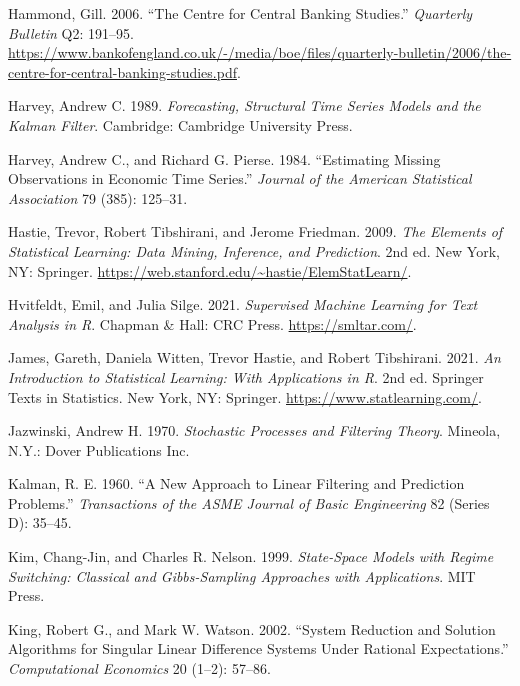 \documentclass[
  letterpaper,
]{book}
\newlength{\cslhangindent}
\newlength{\cslentryspacingunit} %
\newenvironment{CSLReferences}[2] %
 {%
  \setlength{\parindent}{0pt}
  \ifodd #1
  \let\oldpar\par
  \def\par{\hangindent=\cslhangindent\oldpar}
  \fi
  \setlength{\parskip}{#2\cslentryspacingunit}
 }%
 {}
\begin{document}
\begin{CSLReferences}{1}{0}
\leavevmode{}%
Hammond, Gill. 2006. {``The Centre for Central Banking Studies.''}
\emph{Quarterly Bulletin} Q2: 191--95.
\url{https://www.bankofengland.co.uk/-/media/boe/files/quarterly-bulletin/2006/the-centre-for-central-banking-studies.pdf}.

\leavevmode{}%
Harvey, Andrew C. 1989. \emph{Forecasting, Structural Time Series Models
and the Kalman Filter}. Cambridge: Cambridge University Press.

\leavevmode{}%
Harvey, Andrew C., and Richard G. Pierse. 1984. {``Estimating Missing
Observations in Economic Time Series.''} \emph{Journal of the American
Statistical Association} 79 (385): 125--31.

\leavevmode{}%
Hastie, Trevor, Robert Tibshirani, and Jerome Friedman. 2009. \emph{The
Elements of Statistical Learning: Data Mining, Inference, and
Prediction}. 2nd ed. New York, NY: Springer.
\url{https://web.stanford.edu/~hastie/ElemStatLearn/}.

\leavevmode{}%
Hvitfeldt, Emil, and Julia Silge. 2021. \emph{Supervised Machine
Learning for Text Analysis in {R}}. Chapman \& Hall: CRC Press.
\url{https://smltar.com/}.

\leavevmode{}%
James, Gareth, Daniela Witten, Trevor Hastie, and Robert Tibshirani.
2021. \emph{An Introduction to Statistical Learning: With Applications
in {R}}. 2nd ed. Springer Texts in Statistics. New York, NY: Springer.
\url{https://www.statlearning.com/}.

\leavevmode{}%
Jazwinski, Andrew H. 1970. \emph{Stochastic Processes and Filtering
Theory}. Mineola, N.Y.: Dover Publications Inc.

\leavevmode{}%
Kalman, R. E. 1960. {``A New Approach to Linear Filtering and Prediction
Problems.''} \emph{Transactions of the ASME Journal of Basic
Engineering} 82 (Series D): 35--45.

\leavevmode{}%
Kim, Chang-Jin, and Charles R. Nelson. 1999. \emph{State-Space Models
with Regime Switching: Classical and Gibbs-Sampling Approaches with
Applications}. MIT Press.

\leavevmode{}%
King, Robert G., and Mark W. Watson. 2002. {``System Reduction and
Solution Algorithms for Singular Linear Difference Systems Under
Rational Expectations.''} \emph{Computational Economics} 20 (1--2):
57--86.


\end{CSLReferences}
\end{document}
